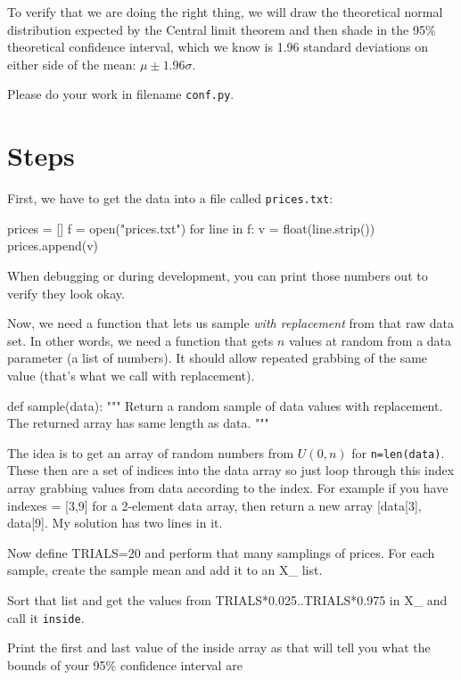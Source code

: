 \begin{fullwidth}
To verify that we are doing the right thing, we will draw the theoretical normal distribution expected by the Central limit theorem and then shade in the 95\% theoretical confidence interval, which we know is 1.96 standard deviations on either side of the mean: $\mu \pm 1.96\sigma$.

Please do your work in filename {\tt conf.py}.

\section{Steps}

\step First, we have to get the data into a file called {\tt prices.txt}:

\begin{pyverbatim}
prices = []
f = open("prices.txt")
for line in f:
	v = float(line.strip())
	prices.append(v)
\end{pyverbatim}

When debugging or during development, you can print those numbers out to verify they look okay.

\step Now, we need a function that lets us sample {\em with replacement} from that raw data set. In other words, we need a function that gets $n$ values at random from a data parameter (a list of numbers). It should allow repeated grabbing of the same value (that's what we call with replacement).

\begin{pyverbatim}
def sample(data):
	"""
	Return a random sample of data values with replacement.
	The returned array has same length as data.
	"""
\end{pyverbatim}

The idea is to get an array of random numbers from $U(0,n)$ for {\tt n=len(data)}. These then are a set of indices into the data array so just loop through this index array grabbing values from data according to the index. For example if you have indexes = [3,9] for a 2-element data array, then return a new array [data[3], data[9]. My solution has two lines in it.

\step Now define TRIALS=20 and perform that many samplings of prices. For each sample, create the sample mean and add it to an X\_ list.

\step Sort that list and get the values from TRIALS*0.025..TRIALS*0.975 in X\_ and call it {\tt inside}.

\step Print the first and last value of the inside array as that will tell you what the bounds of your 95\% confidence interval are


\end{fullwidth}
